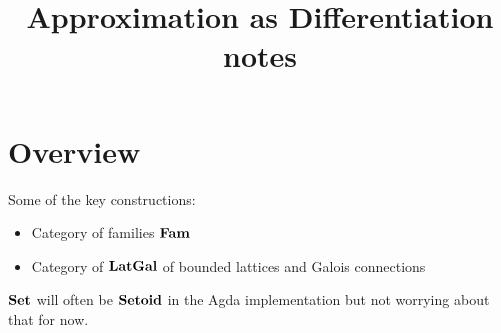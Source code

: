 \documentclass[acmsmall,nonacm]{acmart}
\begin{document}
\title{Approximation as Differentiation notes}
\maketitle

\section{Overview}

Some of the key constructions:
\begin{itemize}
\item Category of families $\mathbf{Fam}$
\item Category of $\mathbf{LatGal}$ of bounded lattices and Galois connections
\end{itemize}

\noindent $\mathbf{Set}$ will often be $\mathbf{Setoid}$ in the Agda implementation but not worrying about that for now.


% 
\end{document}
